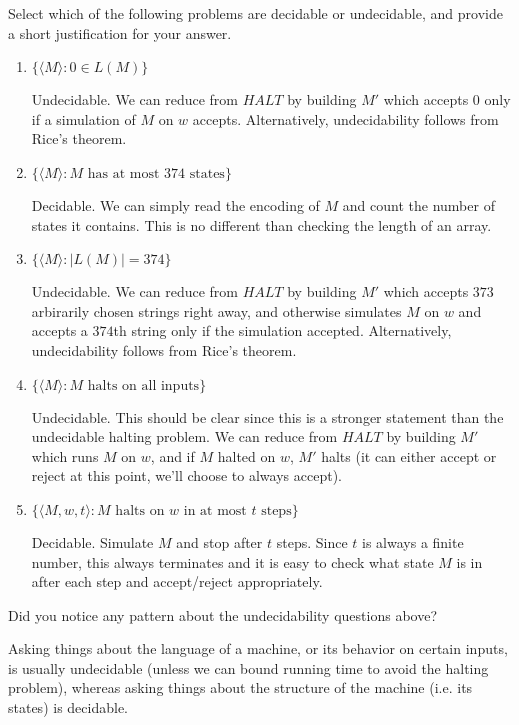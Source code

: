 \documentclass[fleqn]{article}
\begin{document}
\noindent Select which of the following problems are decidable or undecidable, and provide a short justification for your answer.
\begin{enumerate}
    \item $\{\langle M \rangle : 0 \in L(M)\}$
    \begin{answer}
        Undecidable. We can reduce from $HALT$ by building $M'$ which accepts $0$ only if a simulation of $M$ on $w$ accepts. Alternatively, undecidability follows from Rice's theorem.
    \end{answer}
    \item $\{\langle M \rangle : M\text{ has at most 374 states}\}$
    \begin{answer}
        Decidable. We can simply read the encoding of $M$ and count the number of states it contains. This is no different than checking the length of an array.
    \end{answer}
    \item $\{\langle M \rangle : |L(M)| = 374\}$
    \begin{answer}
        Undecidable. We can reduce from $HALT$ by building $M'$ which accepts $373$ arbirarily chosen strings right away, and otherwise simulates $M$ on $w$ and accepts a $374$th string only if the simulation accepted. Alternatively, undecidability follows from Rice's theorem.
    \end{answer}
    \item $\{\langle M \rangle : M\text{ halts on all inputs}\}$
    \begin{answer}
        Undecidable. This should be clear since this is a stronger statement than the undecidable halting problem. We can reduce from $HALT$ by building $M'$ which runs $M$ on $w$, and if $M$ halted on $w$, $M'$ halts (it can either accept or reject at this point, we'll choose to always accept).
    \end{answer}
    \item $\{\langle M, w, t \rangle : M\text{ halts on $w$ in at most $t$ steps}\}$
    \begin{answer}
        Decidable. Simulate $M$ and stop after $t$ steps. Since $t$ is always a finite number,
        this always terminates and it is easy to check what state $M$ is in after each step
        and accept/reject appropriately.
    \end{answer}
\end{enumerate}

\noindent Did you notice any pattern about the undecidability questions above?
\begin{answer}
    Asking things about the language of a machine, or its behavior on certain inputs, is usually undecidable (unless we can bound running time to avoid the halting problem), whereas asking things about the structure of the machine (i.e. its states) is decidable.
\end{answer}
\end{document}
